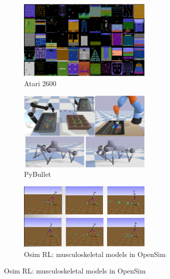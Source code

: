 \begin{figure}[h!]
	\begin{subfigure}[b]{0.3\textwidth}
		\centering
		\includegraphics[width=0.7\textwidth]{figures/existing_envs/atari_2600.png}
		\caption{Atari 2600}
		\label{fig:atari_2600}
	\end{subfigure}
	\hfill
	\begin{subfigure}[b]{0.3\textwidth}
		\centering
		\includegraphics[width=0.7\textwidth]{figures/existing_envs/pybullet.png}
		\caption{PyBullet}
		\label{fig:pybullet}
	\end{subfigure}
	\hfill
	\begin{subfigure}[b]{0.3\textwidth}
		\centering
		\includegraphics[width=0.7\textwidth]{figures/existing_envs/osim_rl.png}
		\caption{Osim RL: musculoskeletal models in OpenSim}
		\label{fig:osim_rl}
	\end{subfigure}
	

\end{figure}
